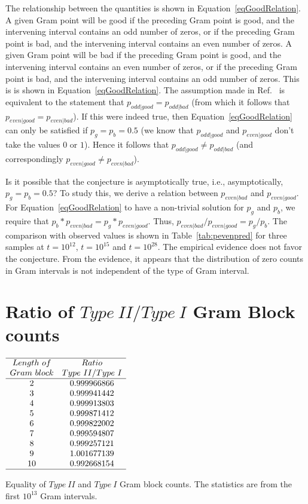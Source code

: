 \documentclass[twoside]{article}
\begin{document}
The relationship between the quantities is shown in Equation~\ref{eqGoodRelation}. A given Gram point will be good if the preceding Gram point is good, and the intervening interval contains an odd number of zeros, or if the preceding Gram point is bad, and the intervening interval contains an even number of zeros. A given Gram point will be bad if the preceding Gram point is good, and the intervening interval contains an even number of zeros, or if the preceding Gram point is bad, and the intervening interval contains an odd number of zeros. This is is shown in Equation~\ref{eqGoodRelation}. The assumption made in Ref.~\cite{Odlyzko 1992} is equivalent to the statement that $p_{odd|good} = p_{odd|bad}$ (from which it follows that  $p_{even|good} = p_{even|bad}$). If this were indeed true, then Equation~\ref{eqGoodRelation} can only be satisfied if $p_g = p_b = 0.5$ (we know that $p_{odd|good}$ and $p_{even|good}$ don't take the values $0$ or $1$). Hence it follows that $p_{odd|good} \neq p_{odd|bad}$ (and correspondingly $p_{even|good} \neq p_{even|bad}$). 

Is it possible that the conjecture is asymptotically true, i.e., asymptotically, $p_g = p_b = 0.5$? To study this, we derive a relation between $p_{even|bad}$ and $p_{even|good}$. For Equation~\ref{eqGoodRelation} to have a non-trivial solution for $p_g$ and $p_b$, we require that $p_b*p_{even|bad} = p_g*p_{even|good}$. Thus, $p_{even|bad}/p_{even|good}= p_g/p_b$. The comparison with observed values is shown in Table~\ref{tab:pevenpred} for three samples at $t=10^{12}$, $t=10^{15}$  and $t=10^{28}$. The empirical evidence does not favor the conjecture. From the evidence, it appears that the distribution of zero counts in Gram intervals is not independent of the type of Gram interval. 

\section{\label{sec6}Ratio of $Type~II/Type~I$ Gram Block counts}

\begin{table}
\centering \(\begin{array}{cc}
\hline
Length~of 	& Ratio  \\
Gram~block	& Type~II/Type~I \\
\hline
2& 0.999966866\\
3& 0.999941442\\
4& 0.999913803\\
5& 0.999871412\\
6& 0.999822002\\
7& 0.999594807\\
8& 0.999257121\\
9& 1.001677139\\
10& 0.992668154\\
\hline
\end{array}\)
\caption{Equality of $Type~II$ and $Type~I$ Gram block counts. The statistics are from the first $10^{13}$ Gram intervals.} \label{tab:rosser}
\end{table}
\end{document}
